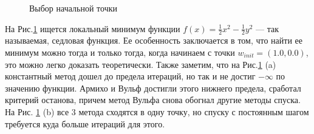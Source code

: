 \documentclass{article}
\begin{document}
	\vspace{1cm}
	
	\begin{figure}[H]
		\centering
		\hfill %
		\caption{Выбор начальной точки}
		\label{fig:start_point}
	\end{figure}
	
	На Рис.\ref{fig:start_point} ищется локальный минимум функции $f(x) = \frac{1}{2}x^2 - \frac{1}{2}y^2$ --- так называемая, седловая функция. Ее особенность заключается в том, что найти ее минимум можно тогда и только тогда, когда начинаем с точки $w_{init} = (1.0, 0.0)$, это можно легко доказать теоретически. Также заметим, что на Рис.\ref{fig:start_point} (a) константный метод дошел до предела итераций, но так и не достиг $-\infty$ по значению функции. Армихо и Вульф достигли этого нижнего предела, сработал критерий останова, причем метод Вульфа снова обогнал другие методы спуска. На Рис. \ref{fig:start_point} (b) все 3 метода сходятся в одну точку, но спуску с постоянным шагом требуется куда больше итераций для этого.
	
	
	
	
	
	
	
	
	
	
	
	
	
	
	
	
	
	
	
\end{document}
